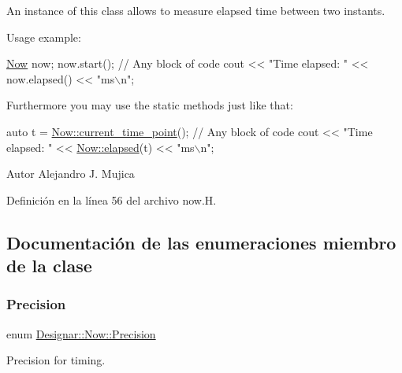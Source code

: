 An instance of this class allows to measure elapsed time between two instants.

Usage example\+: 
\begin{DoxyCode}
\hyperlink{class_designar_1_1_now_ad96b225953507a5a7853aef2c6b30641}{Now} now;
now.start();
\textcolor{comment}{// Any block of code}
cout << \textcolor{stringliteral}{"Time elapsed: "} << now.elapsed() << \textcolor{stringliteral}{"ms\(\backslash\)n"};
\end{DoxyCode}


Furthermore you may use the static methods just like that\+: 
\begin{DoxyCode}
\textcolor{keyword}{auto} t = \hyperlink{class_designar_1_1_now_af862bb15a2202e02e31a1d11fac08dcf}{Now::current\_time\_point}();
\textcolor{comment}{// Any block of code}
cout << \textcolor{stringliteral}{"Time elapsed: "} << \hyperlink{class_designar_1_1_now_a3219d85172fc9628ef90f66c1d69a8e0}{Now::elapsed}(t) << \textcolor{stringliteral}{"ms\(\backslash\)n"};
\end{DoxyCode}


\begin{DoxyAuthor}{Autor}
Alejandro J. Mujica 
\end{DoxyAuthor}


Definición en la línea 56 del archivo now.\+H.



\subsection{Documentación de las enumeraciones miembro de la clase}
\mbox{\label{class_designar_1_1_now_a3c9f5e57907c88cbe63c70a64638c072}} 
\subsubsection{\texorpdfstring{Precision}{Precision}}
{\footnotesize\ttfamily enum \hyperlink{class_designar_1_1_now_a3c9f5e57907c88cbe63c70a64638c072}{Designar\+::\+Now\+::\+Precision}\hspace{0.3cm}{\ttfamily [strong]}}



Precision for timing. 

